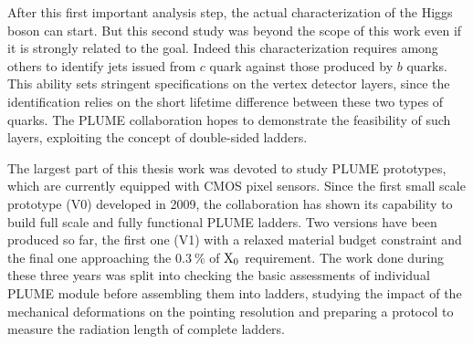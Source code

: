 After this first important analysis step, the actual characterization of the Higgs boson can start. 
But this second study was beyond the scope of this work even if it is strongly related to the goal. 
Indeed this characterization requires among others to identify jets issued from $c$ quark against those produced by $b$ quarks. 
This ability sets stringent specifications on the vertex detector layers, since the identification relies on the short lifetime difference between these two types of quarks. 
The \gls{PLUME} collaboration hopes to demonstrate the feasibility of such layers, exploiting the concept of double-sided ladders.



The largest part of this thesis work was devoted to study \gls{PLUME} prototypes, which are currently equipped with \gls{CMOS} pixel sensors.
Since the first small scale prototype (V0) developed in 2009, the collaboration has shown its capability to build full scale and fully functional \gls{PLUME} ladders.
Two versions have been produced so far, the first one (V1) with a relaxed material budget constraint and the final one approaching the $0.3~\%$ of $\rm{X_{0}}$ requirement.
The work done during these three years was split into checking the basic assessments of individual \gls{PLUME} module before assembling them into ladders, studying the impact of the mechanical deformations on the pointing resolution and preparing a protocol to measure the radiation length of complete ladders.

